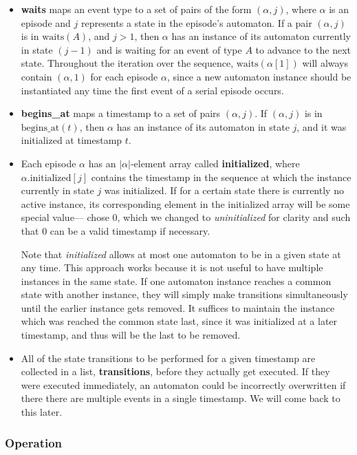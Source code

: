 \begin{itemize}
\item \textbf{waits} maps an event type to a set of pairs of the form $ (\alpha, j) $, where $ \alpha $ is an episode and $ j $ represents a state in the episode's automaton. If a pair $ (\alpha, j) $ is in $ \text{waits}(A) $, and $ j > 1 $, then $ \alpha $ has an instance of its automaton currently in state $ (j - 1) $ and is waiting for an event of type $ A $ to advance to the next state. Throughout the iteration over the sequence, $ \text{waits}(\alpha[1]) $ will always contain $ (\alpha, 1) $ for each episode $ \alpha $, since a new automaton instance should be instantiated any time the first event of a serial episode occurs.
\item \textbf{begins\_at} maps a timestamp to a set of pairs $ (\alpha, j) $. If $ (\alpha, j) $ is in $ \text{begins\_at}(t) $, then $ \alpha $ has an instance of its automaton in state $ j $, and it was initialized at timestamp $ t $.
\item Each episode $ \alpha $ has an $ | \alpha | $-element array called \textbf{initialized}, where $ \alpha \text{.initialized}[j] $ contains the timestamp in the sequence at which the instance currently in state $ j $ was initialized. If for a certain state there is currently no active instance, its corresponding element in the initialized array will be some special value---\cite{winepi97} chose 0, which we changed to \emph{uninitialized} for clarity and such that 0 can be a valid timestamp if necessary.

Note that \emph{initialized} allows at most one automaton to be in a given state at any time. This approach works because it is not useful to have multiple instances in the same state. If one automaton instance reaches a common state with another instance, they will simply make transitions simultaneously until the earlier instance gets removed. It suffices to maintain the instance which was reached the common state last, since it was initialized at a later timestamp, and thus will be the last to be removed.
\item All of the state transitions to be performed for a given timestamp are collected in a list, \textbf{transitions}, before they actually get executed. If they were executed immediately, an automaton could be incorrectly overwritten if there there are multiple events in a single timestamp. We will come back to this later.
\end{itemize}

\subsubsection{Operation}

